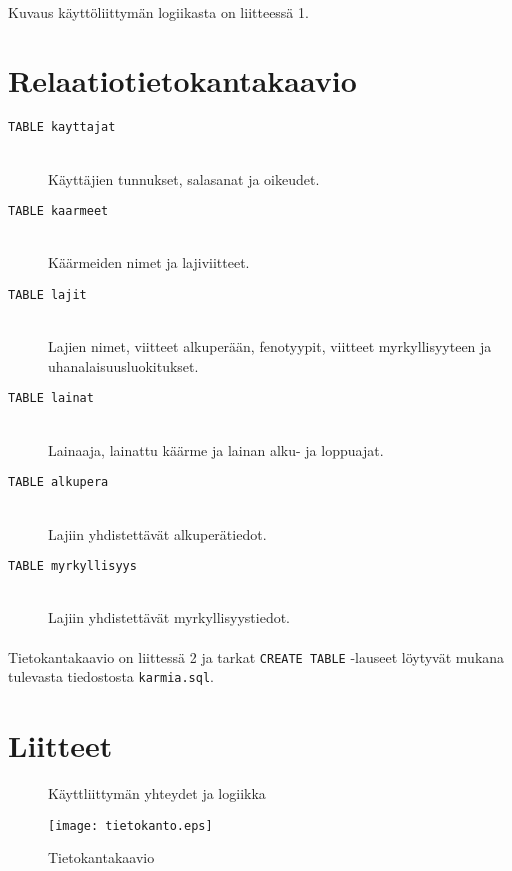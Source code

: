 \documentclass[11pt]{article}
\begin{document}
\paragraph{} Kuvaus käyttöliittymän logiikasta on liitteessä 1.

\section{Relaatiotietokantakaavio}

\begin{description}
\item[\large \texttt{TABLE kayttajat}] \hfill \\
Käyttäjien tunnukset, salasanat ja oikeudet.
\item[\large \texttt{TABLE kaarmeet}] \hfill \\
Käärmeiden nimet ja lajiviitteet.
\item[\large \texttt{TABLE lajit}] \hfill \\
Lajien nimet, viitteet alkuperään, fenotyypit, viitteet myrkyllisyyteen ja uhanalaisuusluokitukset.
\item[\large \texttt{TABLE lainat}] \hfill \\
Lainaaja, lainattu käärme ja lainan alku- ja loppuajat.
\item[\large \texttt{TABLE alkupera}] \hfill \\
Lajiin yhdistettävät alkuperätiedot.
\item[\large \texttt{TABLE myrkyllisyys}] \hfill \\
Lajiin yhdistettävät myrkyllisyystiedot.
\end{description}

\paragraph{} Tietokantakaavio on liittessä 2 ja tarkat \texttt{CREATE TABLE} -lauseet löytyvät mukana tulevasta tiedostosta \texttt{karmia.sql}.

\section{Liitteet}

\begin{figure}
\caption{Käyttliittymän yhteydet ja logiikka}
\end{figure}

\begin{figure}
\caption{Tietokantakaavio}
\texttt{[image: tietokanto.eps]}
\end{figure}
\end{document}
